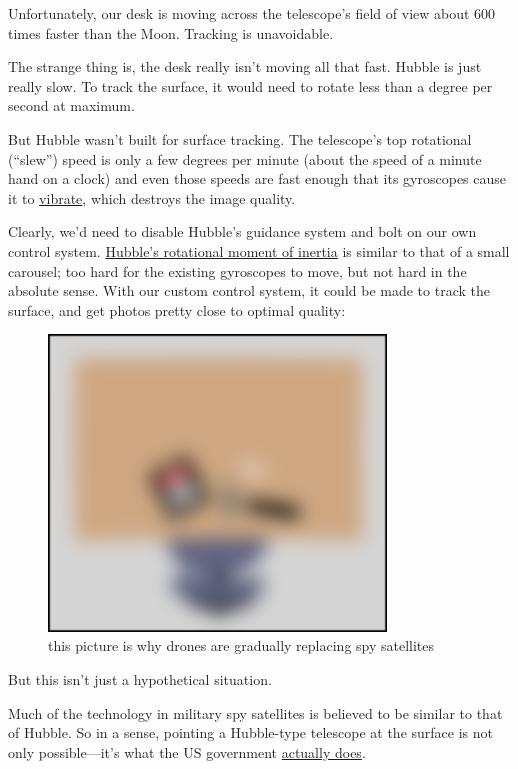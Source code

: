 {Unfortunately, our desk is moving across the telescope’s field of view about 600 times faster than the Moon. Tracking is unavoidable.}

{The strange thing is, the desk really isn’t moving all that fast. Hubble is just really slow. To track the surface, it would need to rotate less than a degree per second at maximum.}

{But Hubble wasn’t built for surface tracking. The telescope’s top rotational (“slew”) speed is only a few degrees per minute (about the speed of a minute hand on a clock) and even those speeds are fast enough that its gyroscopes cause it to \href{http://www.pha.jhu.edu/groups/hst10x/pdffiles/HST10X\_Technical.pdf}{vibrate}, which destroys the image quality.}

{Clearly, we’d need to disable Hubble’s guidance system and bolt on our own control system. \href{http://www.dept.aoe.vt.edu/\~cdhall/courses/aoe5984/bs.pdf}{Hubble’s rotational moment of inertia} is similar to that of a small carousel; too hard for the existing gyroscopes to move, but not hard in the absolute sense. With our custom control system, it could be made to track the surface, and get photos pretty close to optimal quality:}

\begin{figure}[!htbp]
\centering
\includegraphics[scale=0.5, max width=0.8\textwidth]{imgs/a/32/hubble_pluto.png}
\caption{this picture is why drones are gradually replacing spy satellites}
\end{figure}

{But this isn’t just a hypothetical situation.}

{Much of the technology in military spy satellites is believed to be similar to that of Hubble. So in a sense, pointing a Hubble-type telescope at the surface is not only possible—it’s what the US government \href{http://www.onorbit.com/node/3850}{actually does}.}

